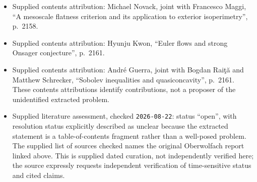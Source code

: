 \documentclass[11pt]{article}
\begin{document}
\begin{itemize}
\item Supplied contents attribution: Michael Novack, joint with Francesco Maggi, ``A mesoscale flatness criterion and its application to exterior isoperimetry'', p.~2158.
\item Supplied contents attribution: Hyunju Kwon, ``Euler flows and strong Onsager conjecture'', p.~2161.
\item Supplied contents attribution: André Guerra, joint with Bogdan Raiţă and Matthew Schrecker, ``Sobolev inequalities and quasiconcavity'', p.~2161. These contents attributions identify contributions, not a proposer of the unidentified extracted problem.
\item Supplied literature assessment, checked \texttt{2026-08-22}: status ``open'', with resolution status explicitly described as unclear because the extracted statement is a table-of-contents fragment rather than a well-posed problem. The supplied list of sources checked names the original Oberwolfach report linked above. This is supplied dated curation, not independently verified here; the source expressly requests independent verification of time-sensitive status and cited claims.
\end{itemize}
\end{document}
